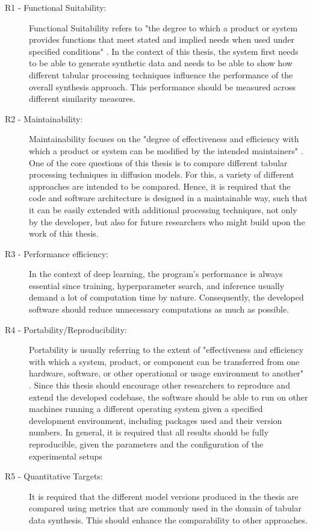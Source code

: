 \begin{description}
	\item[R1 - Functional Suitability:]
		Functional Suitability refers to "the degree to which a product or system provides functions that meet stated and implied needs when used under specified conditions" \cite[p. 219]{bass2013SoftwareArchitecturePractice}.
		In the context of this thesis, the system first needs to be able to generate synthetic data and needs to be able to show how different tabular processing techniques influence the performance of the overall synthesis approach.
		This performance should be measured across different similarity measures.
	\newpage
	\item[R2 - Maintainability:]
		Maintainability focuses on the "degree of effectiveness and efficiency with which a product or system can be modified by the intended maintainers" \cite[p. 220]{bass2013SoftwareArchitecturePractice}.
		One of the core questions of this thesis is to compare different tabular processing techniques in diffusion \glspl{model}.
		For this, a variety of different approaches are intended to be compared.
		Hence, it is required that the code and software architecture is designed in a maintainable way, such that it can be easily extended with additional processing techniques, not only by the developer,
		but also for future researchers who might build upon the work of this thesis.

	\item[R3 - Performance efficiency:]
		In the context of deep learning, the program's performance is always essential since training, hyperparameter search, and inference usually demand a lot of computation time by nature.
		Consequently, the developed software should reduce unnecessary computations as much as possible.

	\item[R4 - Portability/Reproducibility:]
		Portability is usually referring to the extent of "effectiveness and efficiency with which a system, product, or component can be transferred from one hardware, software,
		or other operational or usage environment to another" \cite[p. 220]{bass2013SoftwareArchitecturePractice}.
		Since this thesis should encourage other researchers to reproduce and extend the developed codebase, the software should be able to run on other machines running a different operating system given a specified development environment,
		including packages used and their version numbers.
		In general, it is required that all results should be fully reproducible, given the parameters and the configuration of the experimental setups

	\item[R5 - Quantitative Targets:]
		It is required that the different \gls{model} versions produced in the thesis are compared using metrics that are commonly used in the domain of tabular data synthesis.
		This should enhance the comparability to other approaches.
\end{description}


